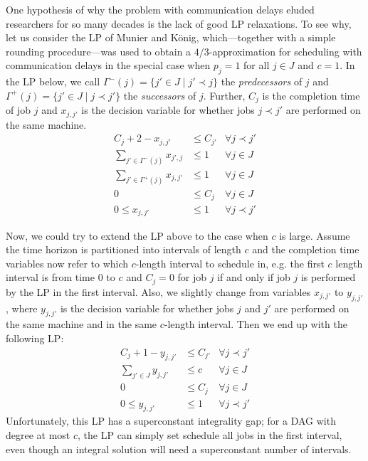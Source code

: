 One hypothesis of why the problem with communication delays eluded researchers for so many decades is the lack of good LP relaxations. 
To see why, let us consider the LP of Munier and K\"{o}nig, which---together with a simple rounding procedure---was used to 
obtain a $4/3$-approximation for scheduling with communication delays in the special case when $p_j=1$ for all $j \in J$ and $c=1$. 
In the LP below, we call $\Gamma^{-}(j) = \{j' \in J \mid j' \prec j\}$ the \emph{predecessors} of $j$ and 
$\Gamma^{+}(j) = \{j' \in J \mid j \prec j'\}$ the \emph{successors} of $j$. 
Further, $C_j$ is the completion time of job $j$ and $x_{j,j'}$ is the decision variable for whether jobs $j \prec j'$ are performed on the same machine.
\begin{align*}
C_{j}+2-x_{j,j'} &\leq C_{j'}  &\forall j \prec j' \\
\sum_{j' \in \Gamma^{-}(j)} x_{j',j}&\leq 1 &\forall j \in J \\
\sum_{j' \in \Gamma^{+}(j)} x_{j,j'}&\leq 1 &\forall j \in J \\
0&\leq C_j   &\forall j \in J \\ 
0 \leq x_{j,j'} &\leq 1  &\forall j \prec j'
\end{align*}

Now, we could try to extend the LP above to the case when $c$ is large.
Assume the time horizon is partitioned into intervals of length $c$ and the completion time variables now refer to which $c$-length interval to schedule in,
e.g. the first $c$ length interval is from time 0 to $c$ and $C_j=0$ for job $j$
if and only if job $j$ is performed by the LP in the first interval. 
Also, we slightly change from variables $x_{j,j'}$ to $y_{j,j'}$, where $y_{j,j'}$ is  the decision variable for whether jobs $j$ and $j'$ are performed on the same machine and in the same $c$-length interval.
Then we end up with the following LP:
\begin{align*}
  C_{j}+1-y_{j,j'}&\leq C_{j'}  &\forall j \prec j' \\
  \sum_{j' \in J } y_{j,j'}&\leq c &\forall j \in J \\
  0&\leq C_j   &\forall j \in J \\ 
  0 \leq y_{j,j'} &\leq 1  &\forall j \prec j'
\end{align*}
Unfortunately, this LP has a superconstant integrality gap; 
for a DAG with degree at most $c$, the LP can simply set schedule all jobs in the first interval, even though an integral solution will need a superconstant number of intervals.




